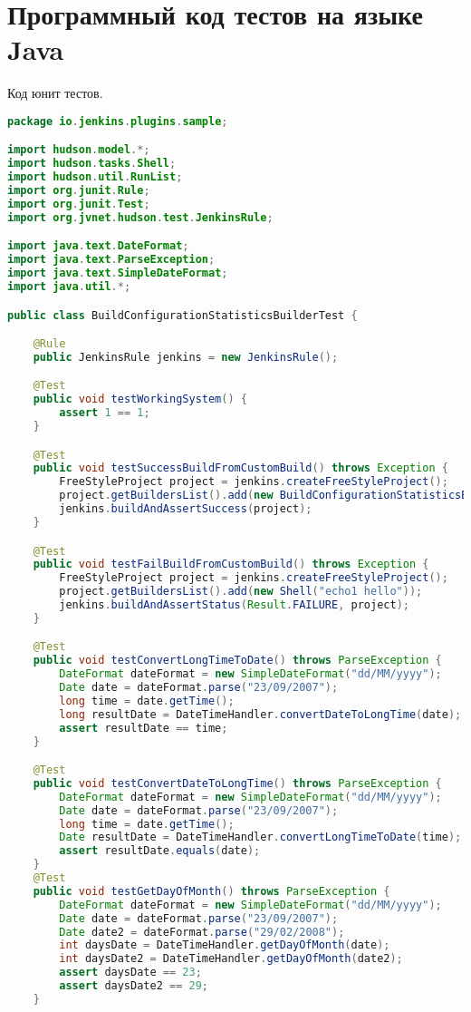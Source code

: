 \chapter{Программный код тестов на языке Java}\label{appendix-extra-examples}

Код юнит тестов.

\begin{lstlisting}[language=Java]
package io.jenkins.plugins.sample;

import hudson.model.*;
import hudson.tasks.Shell;
import hudson.util.RunList;
import org.junit.Rule;
import org.junit.Test;
import org.jvnet.hudson.test.JenkinsRule;

import java.text.DateFormat;
import java.text.ParseException;
import java.text.SimpleDateFormat;
import java.util.*;

public class BuildConfigurationStatisticsBuilderTest {

    @Rule
    public JenkinsRule jenkins = new JenkinsRule();

    @Test
    public void testWorkingSystem() {
        assert 1 == 1;
    }

    @Test
    public void testSuccessBuildFromCustomBuild() throws Exception {
        FreeStyleProject project = jenkins.createFreeStyleProject();
        project.getBuildersList().add(new BuildConfigurationStatisticsBuilder());
        jenkins.buildAndAssertSuccess(project);
    }

    @Test
    public void testFailBuildFromCustomBuild() throws Exception {
        FreeStyleProject project = jenkins.createFreeStyleProject();
        project.getBuildersList().add(new Shell("echo1 hello"));
        jenkins.buildAndAssertStatus(Result.FAILURE, project);
    }

    @Test
    public void testConvertLongTimeToDate() throws ParseException {
        DateFormat dateFormat = new SimpleDateFormat("dd/MM/yyyy");
        Date date = dateFormat.parse("23/09/2007");
        long time = date.getTime();
        long resultDate = DateTimeHandler.convertDateToLongTime(date);
        assert resultDate == time;
    }

    @Test
    public void testConvertDateToLongTime() throws ParseException {
        DateFormat dateFormat = new SimpleDateFormat("dd/MM/yyyy");
        Date date = dateFormat.parse("23/09/2007");
        long time = date.getTime();
        Date resultDate = DateTimeHandler.convertLongTimeToDate(time);
        assert resultDate.equals(date);
    }
    @Test
    public void testGetDayOfMonth() throws ParseException {
        DateFormat dateFormat = new SimpleDateFormat("dd/MM/yyyy");
        Date date = dateFormat.parse("23/09/2007");
        Date date2 = dateFormat.parse("29/02/2008");
        int daysDate = DateTimeHandler.getDayOfMonth(date);
        int daysDate2 = DateTimeHandler.getDayOfMonth(date2);
        assert daysDate == 23;
        assert daysDate2 == 29;
    }


\end{lstlisting}

